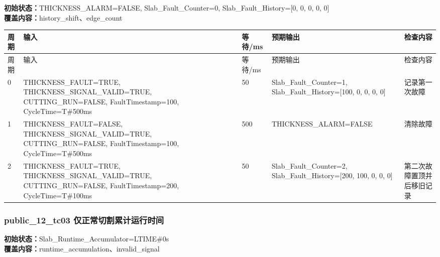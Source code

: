 \noindent\textbf{初始状态：}THICKNESS\_ALARM=FALSE, Slab\_Fault\_Counter=0, Slab\_Fault\_History=[0, 0, 0, 0, 0]\\

\textbf{覆盖内容：}history\_shift、edge\_count

\begin{longtable}{L{1.0cm}L{4.7cm}L{1.4cm}L{4.0cm}L{2.1cm}}

\toprule

周期 & 输入 & 等待/ms & 预期输出 & 检查内容\\

\midrule

\endfirsthead

\toprule

周期 & 输入 & 等待/ms & 预期输出 & 检查内容\\

\midrule

\endhead

0 & THICKNESS\_FAULT=TRUE, THICKNESS\_SIGNAL\_VALID=TRUE, CUTTING\_RUN=FALSE, FaultTimestamp=100, CycleTime=T\#500ms & 50 & Slab\_Fault\_Counter=1, Slab\_Fault\_History=[100, 0, 0, 0, 0] & 记录第一次故障\\

1 & THICKNESS\_FAULT=FALSE, THICKNESS\_SIGNAL\_VALID=TRUE, CUTTING\_RUN=FALSE, FaultTimestamp=100, CycleTime=T\#500ms & 500 & THICKNESS\_ALARM=FALSE & 清除故障\\

2 & THICKNESS\_FAULT=TRUE, THICKNESS\_SIGNAL\_VALID=TRUE, CUTTING\_RUN=FALSE, FaultTimestamp=200, CycleTime=T\#100ms & 50 & Slab\_Fault\_Counter=2, Slab\_Fault\_History=[200, 100, 0, 0, 0] & 第二次故障置顶并后移旧记录\\

\bottomrule

\end{longtable}

\subsubsection{{\ttfamily public\_12\_tc03} 仅正常切割累计运行时间}

\noindent\textbf{初始状态：}Slab\_Runtime\_Accumulator=LTIME\#0s\\

\textbf{覆盖内容：}runtime\_accumulation、invalid\_signal

